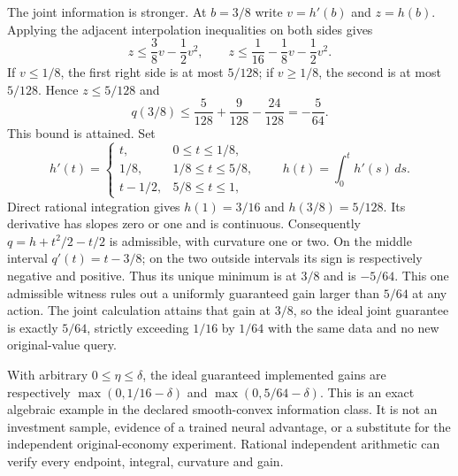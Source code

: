 The joint information is stronger. At $b=3/8$ write $v=h'(b)$
and $z=h(b)$. Applying the adjacent interpolation inequalities on
both sides gives
\[
 z\le\frac38v-\frac12v^2,
 \qquad
 z\le\frac1{16}-\frac18v-\frac12v^2.
\]
If $v\le1/8$, the first right side is at most $5/128$;
if $v\ge1/8$, the second is at most $5/128$. Hence
$z\le5/128$ and
\[
 q(3/8)\le\frac5{128}+\frac9{128}-\frac{24}{128}
                  =-\frac5{64}.
\]
This bound is attained. Set
\[
 h'(t)=\begin{cases}
 t,&0\le t\le1/8,\\
 1/8,&1/8\le t\le5/8,\\
 t-1/2,&5/8\le t\le1,
 \end{cases}
 \qquad h(t)=\int_0^t h'(s)\,ds.
\]
Direct rational integration gives $h(1)=3/16$ and
$h(3/8)=5/128$. Its derivative has slopes zero or one and is
continuous. Consequently $q=h+t^2/2-t/2$ is admissible, with
curvature one or two. On the middle interval
$q'(t)=t-3/8$; on the two outside intervals its sign is respectively
negative and positive. Thus its unique minimum is at $3/8$ and is
$-5/64$. This one admissible witness rules out a uniformly guaranteed
gain larger than $5/64$ at any action. The joint calculation attains
that gain at $3/8$, so the ideal joint guarantee is exactly $5/64$,
strictly exceeding $1/16$ by $1/64$ with the same data and no new
original-value query.

With arbitrary $0\le\eta\le\delta$, the ideal guaranteed
implemented gains are respectively $\max(0,1/16-\delta)$ and
$\max(0,5/64-\delta)$. This is an exact algebraic example in the
declared smooth-convex information class. It is not an investment
sample, evidence of a trained neural advantage, or a substitute for
the independent original-economy experiment. Rational independent
arithmetic can verify every endpoint, integral, curvature and gain.
